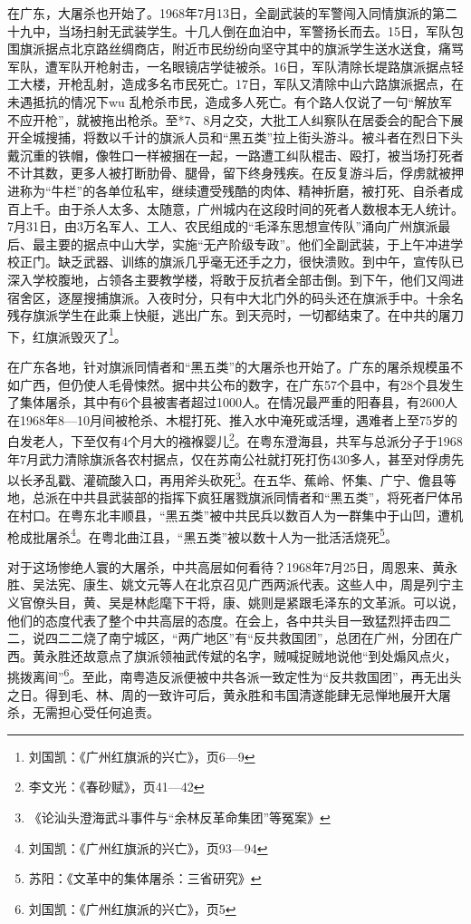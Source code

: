 在广东，大屠杀也开始了。1968年7月13日，全副武装的军警闯入同情旗派的第二十九中，当场扫射无武装学生。十几人倒在血泊中，军警扬长而去。15日，军队包围旗派据点北京路丝绸商店，附近市民纷纷向坚守其中的旗派学生送水送食，痛骂军队，遭军队开枪射击，一名眼镜店学徒被杀。16日，军队清除长堤路旗派据点轻工大楼，开枪乱射，造成多名市民死亡。17日，军队又清除中山六路旗派据点，在未遇抵抗的情况下wu 乱枪杀市民，造成多人死亡。有个路人仅说了一句“解放军不应开枪”，就被拖出枪杀。至*7、8月之交，大批工人纠察队在居委会的配合下展开全城搜捕，将数以千计的旗派人员和“黑五类”拉上街头游斗。被斗者在烈日下头戴沉重的铁帽，像牲口一样被捆在一起，一路遭工纠队棍击、殴打，被当场打死者不计其数，更多人被打断肋骨、腿骨，留下终身残疾。在反复游斗后，俘虏就被押进称为“牛栏”的各单位私牢，继续遭受残酷的肉体、精神折磨，被打死、自杀者成百上千。由于杀人太多、太随意，广州城内在这段时间的死者人数根本无人统计。7月31日，由3万名军人、工人、农民组成的“毛泽东思想宣传队”涌向广州旗派最后、最主要的据点中山大学，实施“无产阶级专政”。他们全副武装，于上午冲进学校正门。缺乏武器、训练的旗派几乎毫无还手之力，很快溃败。到中午，宣传队已深入学校腹地，占领各主要教学楼，将敢于反抗者全部击倒。到下午，他们又闯进宿舍区，逐屋搜捕旗派。入夜时分，只有中大北门外的码头还在旗派手中。十余名残存旗派学生在此乘上快艇，逃出广东。到天亮时，一切都结束了。在中共的屠刀下，红旗派毁灭了\footnote{刘国凯：《广州红旗派的兴亡》，页6—9}。

在广东各地，针对旗派同情者和“黑五类”的大屠杀也开始了。广东的屠杀规模虽不如广西，但仍使人毛骨悚然。据中共公布的数字，在广东57个县中，有28个县发生了集体屠杀，其中有6个县被害者超过1000人。在情况最严重的阳春县，有2600人在1968年8—10月间被枪杀、木棍打死、推入水中淹死或活埋，遇难者上至75岁的白发老人，下至仅有4个月大的襁褓婴儿\footnote{李文光：《春砂赋》，页41—42}。在粤东澄海县，共军与总派分子于1968年7月武力清除旗派各农村据点，仅在苏南公社就打死打伤430多人，甚至对俘虏先以长矛乱戳、灌硫酸入口，再用斧头砍死\footnote{《论汕头澄海武斗事件与“余林反革命集团”等冤案》}。在五华、蕉岭、怀集、广宁、儋县等地，总派在中共县武装部的指挥下疯狂屠戮旗派同情者和“黑五类”，将死者尸体吊在村口。在粤东北丰顺县，“黑五类”被中共民兵以数百人为一群集中于山凹，遭机枪成批屠杀\footnote{刘国凯：《广州红旗派的兴亡》，页93—94}。在粤北曲江县，“黑五类”被以数十人为一批活活烧死\footnote{苏阳：《文革中的集体屠杀：三省研究》}。

对于这场惨绝人寰的大屠杀，中共高层如何看待？1968年7月25日，周恩来、黄永胜、吴法宪、康生、姚文元等人在北京召见广西两派代表。这些人中，周是列宁主义官僚头目，黄、吴是林彪麾下干将，康、姚则是紧跟毛泽东的文革派。可以说，他们的态度代表了整个中共高层的态度。在会上，各中共头目一致猛烈抨击四二二，说四二二烧了南宁城区，“两广地区”有“反共救国团”，总团在广州，分团在广西。黄永胜还故意点了旗派领袖武传斌的名字，贼喊捉贼地说他“到处煽风点火，挑拨离间”\footnote{刘国凯：《广州红旗派的兴亡》，页5}。至此，南粤造反派便被中共各派一致定性为“反共救国团”，再无出头之日。得到毛、林、周的一致许可后，黄永胜和韦国清遂能肆无忌惮地展开大屠杀，无需担心受任何追责。

